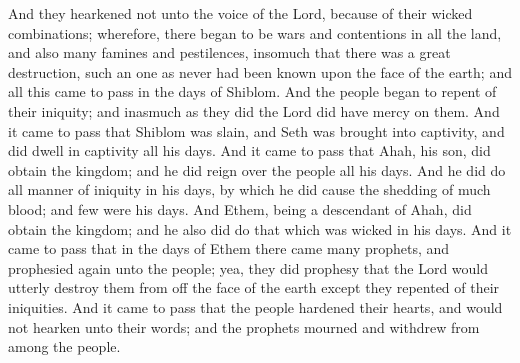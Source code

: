And they hearkened not unto the voice of the Lord, because of their wicked combinations; wherefore, there began to be wars and contentions in all the land, and also many famines and pestilences, insomuch that there was a great destruction, such an one as never had been known upon the face of the earth; and all this came to pass in the days of Shiblom.
\bverse \iffalse And the people began to repent of their iniquity; and inasmuch as they did the Lord did have mercy on them. \fi
And the people began to repent of their iniquity; and inasmuch as they did the Lord did have mercy on them.
\bverse \iffalse And it came to pass that Shiblom was slain, and Seth was brought into captivity, and did dwell in captivity all his days. \fi
And it came to pass that Shiblom was slain, and Seth was brought into captivity, and did dwell in captivity all his days.
\bverse \iffalse And it came to pass that Ahah, his son, did obtain the kingdom; and he did reign over the people all his days. And he did do all manner of iniquity in his days, by which he did cause the shedding of much blood; and few were his days. \fi
And it came to pass that Ahah, his son, did obtain the kingdom; and he did reign over the people all his days. And he did do all manner of iniquity in his days, by which he did cause the shedding of much blood; and few were his days.
\bverse \iffalse And Ethem, being a descendant of Ahah, did obtain the kingdom; and he also did do that which was wicked in his days. \fi
And Ethem, being a descendant of Ahah, did obtain the kingdom; and he also did do that which was wicked in his days.
\bverse \iffalse And it came to pass that in the days of Ethem there came many prophets, and prophesied again unto the people; yea, they did prophesy that the Lord would utterly destroy them from off the face of the earth except they repented of their iniquities. \fi
And it came to pass that in the days of Ethem there came many prophets, and prophesied again unto the people; yea, they did prophesy that the Lord would utterly destroy them from off the face of the earth except they repented of their iniquities.
\bverse \iffalse And it came to pass that the people hardened their hearts, and would not hearken unto their words; and the prophets mourned and withdrew from among the people. \fi
And it came to pass that the people hardened their hearts, and would not hearken unto their words; and the prophets mourned and withdrew from among the people.
\bverse \iffalse And it came to pass that Ethem did execute judgment in wickedness all his days; and he begat Moron. And it came to pass that Moron did reign in his stead; and Moron did that which was wicked before the Lord. \fi
